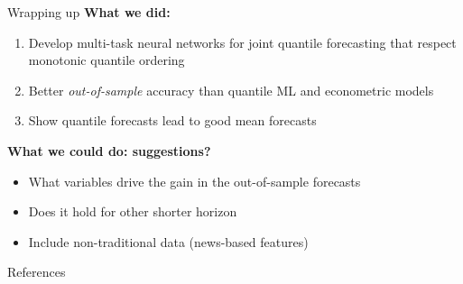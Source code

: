 \documentclass[aspectratio=169]{beamer}
\begin{document}
\begin{frame}{Wrapping up}
    \textbf{What we did:}
	\begin{enumerate}
		\item {Develop multi-task neural networks for joint quantile forecasting that respect monotonic quantile ordering}
        \vspace{.1cm}
		\item {Better \textit{out-of-sample} accuracy than quantile ML and econometric models}
        \vspace{.1cm}
		\item {Show quantile forecasts lead to good mean forecasts} %
        \vspace{.6cm}
	\end{enumerate} 

    \textbf{What we could do: suggestions?}
    \begin{itemize}
        \vspace{.1cm}
        \item What variables drive the gain in the out-of-sample forecasts
        \vspace{.1cm}
        \item Does it hold for other shorter horizon
        \vspace{.1cm}
        \item Include non-traditional data (news-based features)
    \end{itemize}
\end{frame}

\begin{frame}[allowframebreaks]{References}
    \printbibliography
\end{frame}

\appendix
\end{document}
